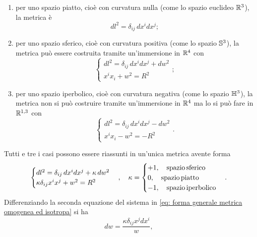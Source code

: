\begin{enumerate}
    \item per uno spazio piatto, cioè con curvatura nulla (come lo spazio euclideo $\mathbb{R}^3$), la metrica è
    \begin{equation}
        dl^2 = \delta_{ij}\,dx^idx^j;
    \end{equation}
    \item per uno spazio sferico, cioè con curvatura positiva (come lo spazio $\mathbb{S}^3$), la metrica può essere costruita tramite un'immersione in $\mathbb{R}^4$ con
    \begin{equation}
        \begin{cases}
            dl^2 = \delta_{ij}\,dx^idx^j + dw^2 \\
            x^ix_i + w^2 = R^2
        \end{cases};
    \end{equation}
    \item per uno spazio iperbolico, cioè con curvatura negativa (come lo spazio $\mathbb{H}^3$), la metrica non si può costruire tramite un'immersione in $\mathbb{R}^4$ ma lo si può fare in $\mathbb{R}^{1,3}$ con
    \begin{equation}
        \begin{cases}
            dl^2 = \delta_{ij}\,dx^idx^j - dw^2 \\
            x^ix_i - w^2 = -R^2
        \end{cases}.
    \end{equation}
\end{enumerate}
Tutti e tre i casi possono essere riassunti in un'unica metrica avente forma 
\begin{equation}
\label{eq: forma generale metrica omogenea ed isotropa}
    \begin{cases}
        dl^2 = \delta_{ij}\,dx^idx^j + \kappa\,dw^2 \\
        \kappa \delta_{ij}x^ix^j + w^2 = R^2
    \end{cases},\quad \kappa = 
    \begin{cases}
        +1,\quad \mathrm{spazio\,sferico} \\
        0,\quad \mathrm{spazio\,piatto} \\
        -1,\quad \mathrm{spazio\,iperbolico}   
    \end{cases}.
\end{equation}
Differenziando la seconda equazione del sistema in \eqref{eq: forma generale metrica omogenea ed isotropa} si ha 
\begin{equation}
    dw = \frac{\kappa\delta_{ij}x^jdx^i}{w},
\end{equation}
